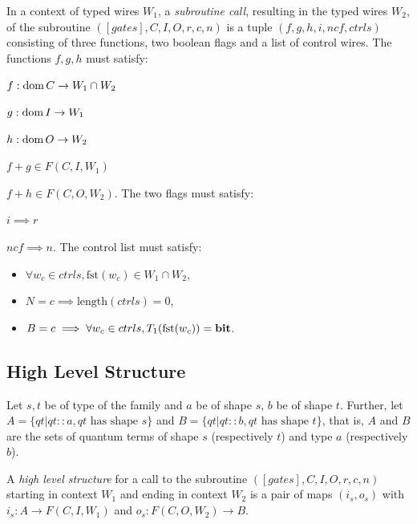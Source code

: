 \begin{definition}\label{def:subroutine_call}
  In a context of typed wires $W_1$,
  a \emph{subroutine call}, resulting in the typed wires $W_2$,
  of the subroutine $([gates],C,I,O,r,c,n)$
  is a tuple $(f,g,h,i,ncf,ctrls)$ consisting of three functions,
  two boolean flags and a list of control wires.
  The functions $f,g,h$ must satisfy:
  \bi
  \item $f:\operatorname*{dom} C \to W_1 \cap W_2$
  \item $g:\operatorname*{dom} I \to W_1$
  \item $h:\operatorname*{dom} O \to W_2$
  \item $f + g \in F(C,I,W_1)$
  \item $f + h \in F(C,O,W_2)$.
  \ei
  The two flags must satisfy:
  \bi
  \item $i \implies r$
  \item $ncf \implies n$.
  \ei
  The control list must satisfy:
  \begin{itemize}
    \item $\forall w_c \in ctrls, \text{fst}(w_c) \in W_1 \cap W_2$,
    \item $N = c \implies \text{length}(ctrls) = 0$,
    \item $B = c \implies \forall w_c \in ctrls, T_1(\text{fst}(w_c)) = \mathbf{{bit}}$.
  \end{itemize}
\end{definition}



\subsection{High Level Structure} %
\label{sub:high_level_structure}

Let $s,t$ be of type of the family 
and $a$ be of shape $s$, $b$ be of shape $t$.
Further, let $A = \{qt|qt::a, qt \text{ has shape }s\}$
and $B = \{qt|qt::b, qt \text{ has shape }t\}$, that is,
$A$ and $B$ are the sets of quantum terms of shape $s$
(respectively $t$) and type $a$ (respectively $b$).

\begin{definition}\label{def:high_level_structure}
  A \emph{high level structure} for a call to the subroutine
  $([gates],C,I,O,r,c,n)$ starting in context $W_1$ and
  ending in context $W_2$ is a
  pair of maps $(i_s,o_s)$ with $i_s:A \to F(C,I,W_1)$
  and $o_s:F(C,O,W_2)\to B$.
\end{definition}

